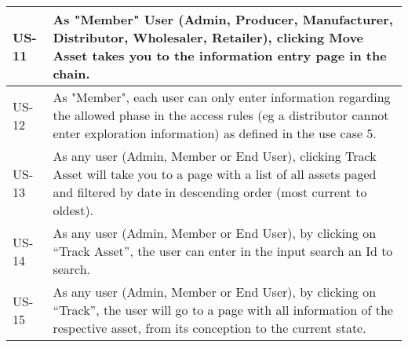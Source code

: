 \begin{table}[htpb]
\begin{tabular}{|l|p{13.5cm}|}
    \hline
    US-11 & As "Member" User (Admin, Producer, Manufacturer, Distributor, Wholesaler, Retailer), clicking Move Asset takes you to the information entry page in the chain.\\
    \hline
    US-12 & As "Member", each user can only enter information regarding the allowed phase in the access rules (eg a distributor cannot enter exploration information) as defined in the use case 5.\\
    \hline
    US-13 & As any user (Admin, Member or End User), clicking Track Asset will take you to a page with a list of all assets paged and filtered by date in descending order (most current to oldest).\\
    \hline
    US-14 & As any user (Admin, Member or End User), by clicking on “Track Asset”, the user can enter in the input search an Id to search.\\
    \hline
    US-15 & As any user (Admin, Member or End User), by clicking on “Track”, the user will go to a page with all information of the respective asset, from its conception to the current state.\\
    \hline
    \end{tabular}
\end{table}